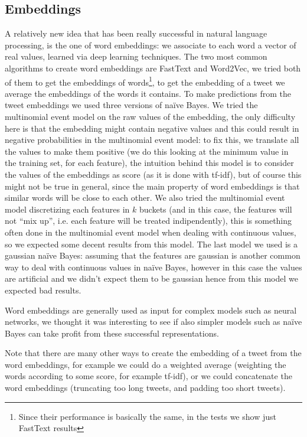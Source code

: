 \subsection*{Embeddings}
A relatively new idea that has been really successful in natural language processing, is the one of word embeddings: we associate to each word a vector of real values, learned via deep learning techniques. The two most common algorithms to create word embeddings are FastText and Word2Vec, we tried both of them to get the embeddings of words\footnote{Since their performance is basically the same, in the tests we show just FastText results}, to get the embedding of a tweet we average the embeddings of the words it contains. To make predictions from the tweet embeddings we used three versions of na\"ive Bayes. We tried the multinomial event model on the raw values of the embedding, the only difficulty here is that the embedding might contain negative values and this could result in negative probabilities in the multinomial event model: to fix this, we translate all the values to make them positive (we do this looking at the minimum value in the training set, for each feature), the intuition behind this model is to consider the values of the embeddings as score (as it is done with tf-idf), but of course this might not be true in general, since the main property of word embeddings is that similar words will be close to each other. We also tried the multinomial event model discretizing each features in $k$ buckets (and in this case, the features will not ``mix up'', i.e. each feature will be treated indipendently), this is something often done in the multinomial event model when dealing with continuous values, so we expected some decent results from this model. The last model we used is a gaussian na\"ive Bayes: assuming that the features are gaussian is another common way to deal with continuous values in na\"ive Bayes, however in this case the values are artificial and we didn't expect them to be gaussian hence from this model we expected bad results.

Word embeddings are generally used as input for complex models such as neural networks, we thought it was interesting to see if also simpler models such as na\"ive Bayes can take profit from these successful representations.

Note that there are many other ways to create the embedding of a tweet from the word embeddings, for example we could do a weighted average (weighting the words according to some score, for example tf-idf), or we could concatenate the word embeddings (truncating too long tweets, and padding too short tweets).

